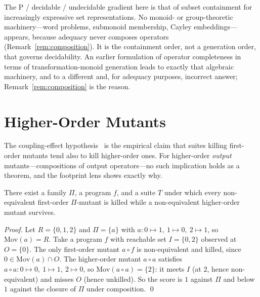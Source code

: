 \documentclass[runningheads,envcountsect,envcountsame]{llncs}
\newcommand{\Mov}{\mathrm{Mov}}
\begin{document}
\begin{remark}
\label{rem:spectrum}
The P / decidable / undecidable gradient here is that of subset containment for
increasingly expressive set representations. No monoid- or group-theoretic
machinery---word problems, submonoid membership, Cayley embeddings---appears,
because adequacy never composes operators (Remark~\ref{rem:composition}). It is
the containment order, not a generation order, that governs decidability. An
earlier formulation of operator completeness in terms of transformation-monoid
generation leads to exactly that algebraic machinery, and to a different and, for
adequacy purposes, incorrect answer; Remark~\ref{rem:composition} is the reason.
\end{remark}

\section{Higher-Order Mutants}
\label{sec:ho}

The coupling-effect hypothesis~\cite{demillo1978} is the empirical claim that
suites killing first-order mutants tend also to kill higher-order ones. For
higher-order \emph{output} mutants---compositions of output operators---no such
implication holds as a theorem, and the footprint lens shows exactly why.

\begin{proposition}
\label{prop:coupling}
There exist a family $\Pi$, a program $f$, and a suite $T$ under which every
non-equivalent first-order $\Pi$-mutant is killed while a non-equivalent
higher-order mutant survives.
\end{proposition}

\begin{proof}
Let $R = \{0,1,2\}$ and $\Pi = \{a\}$ with
$a : 0 \mapsto 1,\ 1 \mapsto 0,\ 2 \mapsto 1$, so $\Mov(a) = R$. Take a program
$f$ with reachable set $I = \{0,2\}$ observed at $O = \{0\}$. The only
first-order mutant $a \circ f$ is non-equivalent and killed, since
$0 \in \Mov(a) \cap O$. The higher-order mutant $a \circ a$ satisfies
$a \circ a : 0 \mapsto 0,\ 1 \mapsto 1,\ 2 \mapsto 0$, so
$\Mov(a \circ a) = \{2\}$: it meets $I$ (at $2$, hence non-equivalent) and misses
$O$ (hence unkilled). So the score is $1$ against $\Pi$ and below $1$ against the
closure of $\Pi$ under composition. \qed
\end{proof}
\end{document}
